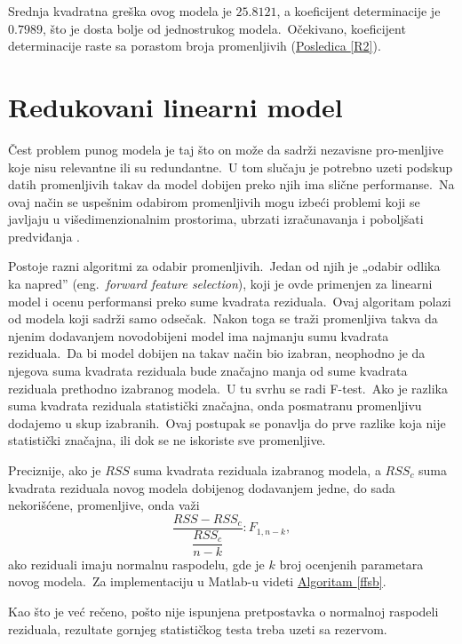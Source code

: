 \documentclass[12pt,a4paper,titlepage,oneside]{article}
\numberwithin{equation}{section}
\numberwithin{figure}{section}
\numberwithin{table}{section}
\theoremstyle{definition}
\theoremstyle{remark}
\begin{document}
Srednja kvadratna greška ovog modela je $25.8121$, a koeficijent determinacije je $0.7989$, što je dosta bolje od jednostrukog modela.\ Očekivano, koeficijent determinacije raste sa porastom broja promenljivih (\hyperref[R2]{Posledica \ref*{R2}}).

\newpage

\thispagestyle{empty}

\section{Redukovani linearni model}\label{Redukovani linearni model}

\setcounter{footnote}{0}

Čest problem punog modela je taj što on može da sadrži nezavisne pro-menljive koje nisu relevantne ili su redundantne.\ U tom slučaju je potrebno uzeti podskup datih promenljivih takav da model dobijen preko njih ima slične performanse.\ Na ovaj način se uspešnim odabirom promenljivih mogu izbeći problemi koji se javljaju u višedimenzionalnim prostorima, ubrzati izračunavanja i poboljšati predviđanja \cite{urlcv}.

Postoje razni algoritmi za odabir promenljivih.\ Jedan od njih je „odabir odlika ka napred” (eng.\ \textit{forward feature selection}), koji je ovde primenjen za linearni model i ocenu performansi preko sume kvadrata reziduala.\ Ovaj algoritam polazi od modela koji sadrži samo odsečak.\ Nakon toga se traži promenljiva takva da njenim dodavanjem novodobijeni model ima najmanju sumu kvadrata reziduala.\ Da bi model dobijen na takav način bio izabran, neophodno je da njegova suma kvadrata reziduala bude značajno manja od sume kvadrata reziduala prethodno izabranog modela.\ U tu svrhu se radi F-test.\ Ako je razlika suma kvadrata reziduala statistički značajna, onda posmatranu promenljivu dodajemo u skup izabranih.\ Ovaj postupak se ponavlja do prve razlike koja nije statistički značajna, ili dok se ne iskoriste sve promenljive.

Preciznije, ako je $RSS$ suma kvadrata reziduala izabranog modela, a $RSS_c$ suma kvadrata reziduala novog modela dobijenog dodavanjem jedne, do sada nekorišćene, promenljive, onda važi \[\dfrac{RSS - RSS_c}{\dfrac{RSS_c}{n - k}}: F_{1, n - k},\] ako reziduali imaju normalnu raspodelu, gde je $k$ broj ocenjenih parametara novog modela.\ Za implementaciju u Matlab-u videti \hyperref[ffsb]{Algoritam \ref*{ffsb}}.

Kao što je već rečeno, pošto nije ispunjena pretpostavka o normalnoj raspodeli reziduala, rezultate gornjeg statističkog testa treba uzeti sa rezervom.
\end{document}
